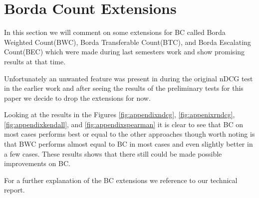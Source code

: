 \section{Borda Count Extensions}
In this section we will comment on some extensions for BC called Borda Weighted Count(BWC), Borda Transferable Count(BTC), and Borda Escalating Count(BEC) which were made during last semesters work and show promising results at that time\cite{ourreport}. 

Unfortunately an unwanted feature was present in during the original nDCG test in the earlier work and after seeing the results of the preliminary tests for this paper we decide to drop the extensions for now. 

Looking at the results in the Figures \ref{fig:appendixndcg}, \ref{fig:appenixrndcg}, \ref{fig:appendixkendall}, and \ref{fig:appendixspearman} it is clear to see that BC on most cases performs best or equal to the other approaches though worth noting is that BWC performs almost equal to BC in most cases and even slightly better in a few cases. These results shows that there still could be made possible improvements on BC.

For a further explanation of the BC extensions we reference to our technical report\cite{ourreport}.




